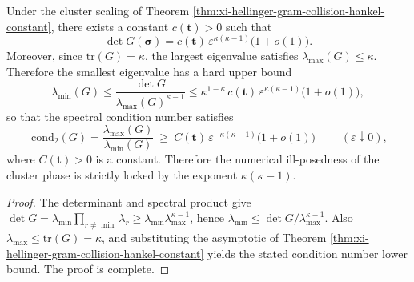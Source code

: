 \begin{corollary}\label{cor:xi-hellinger-gram-cluster-conditioning-exponent}
Under the cluster scaling of Theorem \ref{thm:xi-hellinger-gram-collision-hankel-constant},
there exists a constant \(c(\mathbf t)>0\) such that
\[
\det G(\boldsymbol{\sigma})=c(\mathbf t)\,\varepsilon^{\kappa(\kappa-1)}\bigl(1+o(1)\bigr).
\]
Moreover, since \(\mathrm{tr}(G)=\kappa\), the largest eigenvalue satisfies \(\lambda_{\max}(G)\le \kappa\).
Therefore the smallest eigenvalue has a hard upper bound
\[
\lambda_{\min}(G)\le \frac{\det G}{\lambda_{\max}(G)^{\kappa-1}}
\le \kappa^{1-\kappa}\,c(\mathbf t)\,\varepsilon^{\kappa(\kappa-1)}\bigl(1+o(1)\bigr),
\]
so that the spectral condition number satisfies
\[
\boxed{\;
\mathrm{cond}_2(G)=\frac{\lambda_{\max}(G)}{\lambda_{\min}(G)}
\ \ge\ C(\mathbf t)\,\varepsilon^{-\kappa(\kappa-1)}\bigl(1+o(1)\bigr)\;}
\qquad(\varepsilon\downarrow 0),
\]
where \(C(\mathbf t)>0\) is a constant.
Therefore the numerical ill-posedness of the cluster phase is strictly locked by the exponent \(\kappa(\kappa-1)\).
\end{corollary}
\begin{proof}
The determinant and spectral product give
\(
\det G=\lambda_{\min}\prod_{r\neq\min}\lambda_r\ge \lambda_{\min}\lambda_{\max}^{\kappa-1}
\),
hence \(\lambda_{\min}\le \det G/\lambda_{\max}^{\kappa-1}\).
Also \(\lambda_{\max}\le \mathrm{tr}(G)=\kappa\), and substituting the asymptotic of Theorem \ref{thm:xi-hellinger-gram-collision-hankel-constant} yields the stated condition number lower bound. The proof is complete.
\end{proof}


